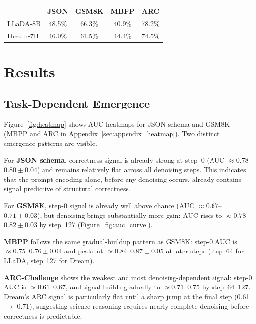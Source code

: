 \documentclass[11pt]{article}
\makeatletter
\providecommand{\linenumbers}{}
\providecommand{\nolinenumbers}{}
\let\old@table\table
\let\old@endtable\endtable
\renewenvironment{table}[1][]{%
  \nolinenumbers\old@table[#1]%
}{%
  \old@endtable\linenumbers%
}
\makeatother
\begin{document}
\begin{table}[t]
  \centering
  \small
  \begin{tabular}{lcccc}
    \toprule
    & \textbf{JSON} & \textbf{GSM8K} & \textbf{MBPP} & \textbf{ARC} \\
    \midrule
    LLaDA-8B & 48.5\% & 66.3\% & 40.9\% & 78.2\% \\
    Dream-7B & 46.0\% & 61.5\% & 44.4\% & 74.5\% \\
    \bottomrule
  \end{tabular}
  \caption{Baseline functional correctness rates (seed=0, 128 denoising steps).}
  \label{tab:baselines}
\end{table}

\section{Results}

\subsection{Task-Dependent Emergence}

Figure~\ref{fig:heatmap} shows AUC heatmaps for JSON schema and GSM8K (MBPP and ARC in Appendix~\ref{sec:appendix_heatmap}).
Two distinct emergence patterns are visible.

For \textbf{JSON schema}, correctness signal is already strong at step~0 (AUC $\approx 0.78$--$0.80 \pm 0.04$) and remains relatively flat across all denoising steps.
This indicates that the prompt encoding alone, before any denoising occurs, already contains signal predictive of structural correctness.

For \textbf{GSM8K}, step-0 signal is already well above chance (AUC $\approx 0.67$--$0.71 \pm 0.03$), but denoising brings substantially more gain: AUC rises to $\approx 0.78$--$0.82 \pm 0.03$ by step~127 (Figure~\ref{fig:auc_curve}).

\textbf{MBPP} follows the same gradual-buildup pattern as GSM8K: step-0 AUC is $\approx 0.75$--$0.76 \pm 0.04$ and peaks at $\approx 0.84$--$0.87 \pm 0.05$ at later steps (step~64 for LLaDA, step~127 for Dream).

\textbf{ARC-Challenge} shows the weakest and most denoising-dependent signal: step-0 AUC is $\approx 0.61$--$0.67$, and signal builds gradually to $\approx 0.71$--$0.75$ by step~64--127. Dream's ARC signal is particularly flat until a sharp jump at the final step (0.61 $\rightarrow$ 0.71), suggesting science reasoning requires nearly complete denoising before correctness is predictable.
\end{document}
